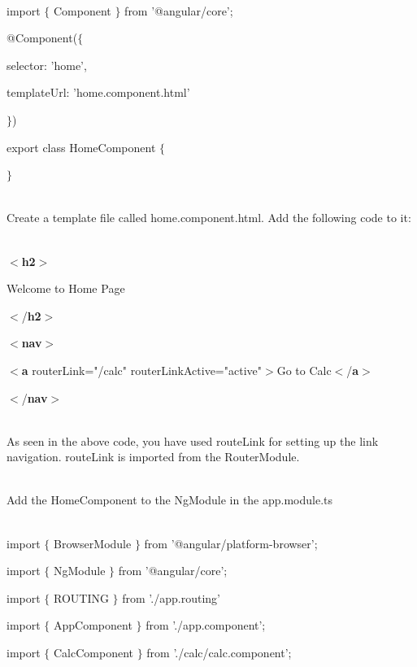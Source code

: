 \documentclass{article}
\begin{document}
\noindent \\ import $\mathrm{\{}$ Component $\mathrm{\}}$ from '@angular/core';

\noindent @Component($\mathrm{\{}$ 

\noindent selector: 'home',

\noindent templateUrl: 'home.component.html'

\noindent $\mathrm{\}}$)

\noindent export class HomeComponent $\mathrm{\{}$

\noindent $\mathrm{\}}$

\noindent \\ Create a template file called home.component.html. Add the following code to it:

\noindent \\ $\mathrm{<}$\textbf{h2}$\mathrm{>}$

\noindent Welcome to Home Page

\noindent $\mathrm{<}$/\textbf{h2}$\mathrm{>}$

\noindent $\mathrm{<}$\textbf{nav}$\mathrm{>}$

\noindent $\mathrm{<}$\textbf{a} routerLink="/calc" routerLinkActive="active"$\mathrm{>}$Go to Calc$\mathrm{<}$/\textbf{a}$\mathrm{>}$

\noindent $\mathrm{<}$/\textbf{nav}$\mathrm{>}$

\noindent 

\noindent \\ As seen in the above code, you have used routeLink for setting up the link navigation. routeLink is imported from the RouterModule.

\noindent 

\noindent \\ Add the HomeComponent to the NgModule in the app.module.ts 

\noindent 

\noindent \\ import $\mathrm{\{}$ BrowserModule $\mathrm{\}}$ from '@angular/platform-browser'; 

\noindent import $\mathrm{\{}$ NgModule $\mathrm{\}}$ from '@angular/core';

\noindent import $\mathrm{\{}$ ROUTING $\mathrm{\}}$ from './app.routing'

\noindent import $\mathrm{\{}$ AppComponent $\mathrm{\}}$ from './app.component'; 

\noindent import $\mathrm{\{}$ CalcComponent $\mathrm{\}}$ from './calc/calc.component';
\end{document}

